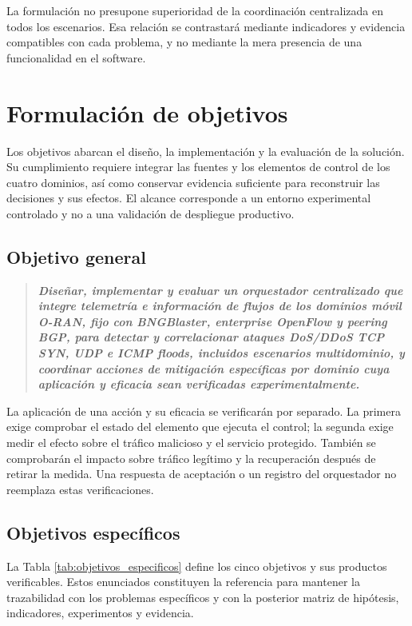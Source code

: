 La formulación no presupone superioridad de la coordinación centralizada en todos los escenarios. Esa relación se contrastará mediante indicadores y evidencia compatibles con cada problema, y no mediante la mera presencia de una funcionalidad en el software.

\section{Formulación de objetivos}

Los objetivos abarcan el diseño, la implementación y la evaluación de la solución. Su cumplimiento requiere integrar las fuentes y los elementos de control de los cuatro dominios, así como conservar evidencia suficiente para reconstruir las decisiones y sus efectos. El alcance corresponde a un entorno experimental controlado y no a una validación de despliegue productivo.

\subsection{Objetivo general}

\begin{quotation}
\textbf{\textit{Diseñar, implementar y evaluar un orquestador centralizado que integre telemetría e información de flujos de los dominios móvil O-RAN, fijo con BNGBlaster, enterprise OpenFlow y peering BGP, para detectar y correlacionar ataques DoS/DDoS TCP SYN, UDP e ICMP floods, incluidos escenarios multidominio, y coordinar acciones de mitigación específicas por dominio cuya aplicación y eficacia sean verificadas experimentalmente.}}
\end{quotation}

La aplicación de una acción y su eficacia se verificarán por separado. La primera exige comprobar el estado del elemento que ejecuta el control; la segunda exige medir el efecto sobre el tráfico malicioso y el servicio protegido. También se comprobarán el impacto sobre tráfico legítimo y la recuperación después de retirar la medida. Una respuesta de aceptación o un registro del orquestador no reemplaza estas verificaciones.

\subsection{Objetivos específicos}

La Tabla \ref{tab:objetivos_especificos} define los cinco objetivos y sus productos verificables. Estos enunciados constituyen la referencia para mantener la trazabilidad con los problemas específicos y con la posterior matriz de hipótesis, indicadores, experimentos y evidencia.

